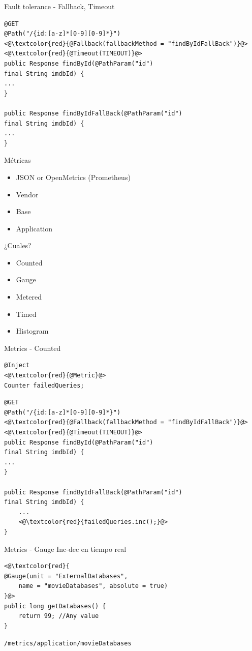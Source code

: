 \documentclass{beamer}
\begin{document}
\begin{frame}[fragile]{Fault tolerance - Fallback, Timeout}
\begin{lstlisting}
@GET
@Path("/{id:[a-z]*[0-9][0-9]*}")
<@\textcolor{red}{@Fallback(fallbackMethod = "findByIdFallBack")}@>
<@\textcolor{red}{@Timeout(TIMEOUT)}@>
public Response findById(@PathParam("id") 
final String imdbId) {
...
}

public Response findByIdFallBack(@PathParam("id") 
final String imdbId) {
...
}
\end{lstlisting}
\end{frame}


\begin{frame}{Métricas}

\begin{itemize}
	\item JSON or OpenMetrics (Prometheus)
	\item Vendor
	\item Base
	\item Application
\end{itemize}

¿Cuales? 
\begin{itemize}
	\item Counted
	\item Gauge
	\item Metered
	\item Timed
	\item Histogram
\end{itemize}

\end{frame}

\begin{frame}[fragile]{Metrics - Counted}
\begin{lstlisting}
@Inject
<@\textcolor{red}{@Metric}@>
Counter failedQueries;
\end{lstlisting}

\begin{lstlisting}
@GET
@Path("/{id:[a-z]*[0-9][0-9]*}")
<@\textcolor{red}{@Fallback(fallbackMethod = "findByIdFallBack")}@>
<@\textcolor{red}{@Timeout(TIMEOUT)}@>
public Response findById(@PathParam("id") 
final String imdbId) {
...
}

public Response findByIdFallBack(@PathParam("id") 
final String imdbId) {
	...
	<@\textcolor{red}{failedQueries.inc();}@>
}
\end{lstlisting}
\end{frame}

\begin{frame}[fragile]{Metrics - Gauge}
Inc-dec en tiempo real
\begin{lstlisting}
<@\textcolor{red}{
@Gauge(unit = "ExternalDatabases",
	name = "movieDatabases", absolute = true)
}@>
public long getDatabases() {
	return 99; //Any value
}
\end{lstlisting}

\lstinline|/metrics/application/movieDatabases|
\end{frame}
\end{document}
